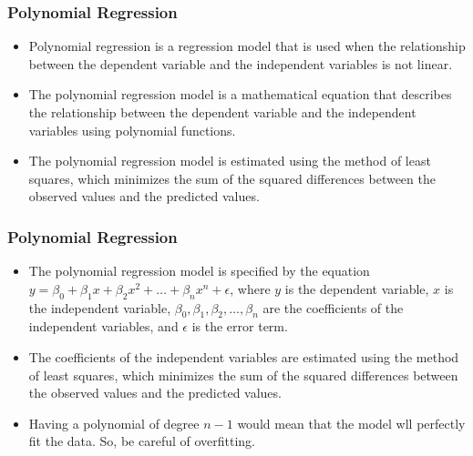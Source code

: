 \documentclass[serif, 9pt, aspectratio=32]{beamer}
\begin{document}
\begin{frame}
    \frametitle{Polynomial Regression}
    \begin{itemize}
        \setlength{\itemsep}{2em}
        \item Polynomial regression is a regression model that is used when the relationship between the dependent variable and the independent variables is not linear.
        \item The polynomial regression model is a mathematical equation that describes the relationship between the dependent variable and the independent variables using polynomial functions.
        \item The polynomial regression model is estimated using the method of least squares, which minimizes the sum of the squared differences between the observed values and the predicted values.
    \end{itemize}
\end{frame}

\begin{frame}
    \frametitle{Polynomial Regression}
    \begin{itemize}
        \setlength{\itemsep}{2em}
        \item The polynomial regression model is specified by the equation $y = \beta_0 + \beta_1 x + \beta_2 x^2 + \ldots + \beta_n x^n + \epsilon$, where $y$ is the dependent variable, $x$ is the independent variable, $\beta_0, \beta_1, \beta_2, \ldots, \beta_n$ are the coefficients of the independent variables, and $\epsilon$ is the error term.
        \item The coefficients of the independent variables are estimated using the method of least squares, which minimizes the sum of the squared differences between the observed values and the predicted values.
        \item Having a polynomial of degree $n - 1$ would mean that the model wll perfectly fit the data. So, be careful of overfitting.
    \end{itemize}
\end{frame}
\end{document}
